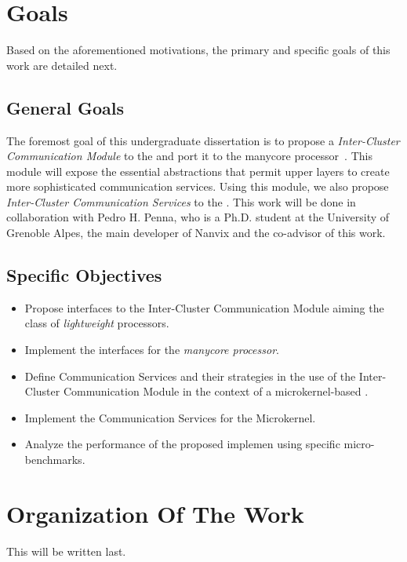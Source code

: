 \section{Goals}
\label{sec.goals}

	Based on the aforementioned motivations, the primary and specific goals of this work are detailed next.

\subsection{General Goals}
\label{sec.goals.general}

	The foremost goal of this undergraduate dissertation is to propose a \textit{Inter-Cluster Communication Module}
	to the \nanvix \hal and port it to the \mppa manycore processor~\cite{DeDinechin2013-1}.
	This module will expose the essential abstractions that permit upper layers to create more
	sophisticated communication services.
	Using this module, we also propose \textit{Inter-Cluster Communication Services} to the \nanvix \microkernel.
	This work will be done in collaboration with Pedro H. Penna, who is a Ph.D. student at the
	University of Grenoble Alpes, the main developer of Nanvix and the co-advisor of this work.

\subsection{Specific Objectives}
\label{sec.goals.specific}

	\begin{itemize}
		\item Propose interfaces to the Inter-Cluster Communication Module aiming
			the class of \textit{lightweight} \manycore processors.
		\item Implement the interfaces for the \textit{\mppa manycore processor}.
		\item Define Communication Services and their strategies in the use of the Inter-Cluster
			Communication Module in the context of a microkernel-based \os.
		\item Implement the Communication Services for the \nanvix Microkernel.
		\item Analyze the performance of the proposed implemen using specific micro-benchmarks.
	\end{itemize}

\section{Organization Of The Work}
\label{sec.organization}

	This will be written last.
